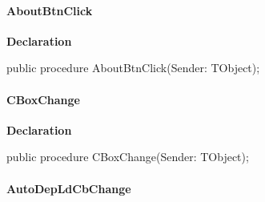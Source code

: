 \documentclass{report}
\newif\ifpdf
\begin{document}
\paragraph*{AboutBtnClick}\hspace*{\fill}

\label{manager.TMnFrm-AboutBtnClick}
\begin{list}{}{
\setlength{\itemindent}{0cm}
\setlength{\listparindent}{0cm}
\setlength{\leftmargin}{\evensidemargin}
\addtolength{\leftmargin}{\tmplength}
\settowidth{\labelsep}{X}
\addtolength{\leftmargin}{\labelsep}
\setlength{\labelwidth}{\tmplength}
}
\item[\textbf{Declaration}\hfill]
\ifpdf
\begin{flushleft}
\fi
\begin{ttfamily}
public procedure AboutBtnClick(Sender: TObject);\end{ttfamily}

\ifpdf
\end{flushleft}
\fi

\end{list}
\paragraph*{CBoxChange}\hspace*{\fill}

\label{manager.TMnFrm-CBoxChange}
\begin{list}{}{
\setlength{\itemindent}{0cm}
\setlength{\listparindent}{0cm}
\setlength{\leftmargin}{\evensidemargin}
\addtolength{\leftmargin}{\tmplength}
\settowidth{\labelsep}{X}
\addtolength{\leftmargin}{\labelsep}
\setlength{\labelwidth}{\tmplength}
}
\item[\textbf{Declaration}\hfill]
\ifpdf
\begin{flushleft}
\fi
\begin{ttfamily}
public procedure CBoxChange(Sender: TObject);\end{ttfamily}

\ifpdf
\end{flushleft}
\fi

\end{list}
\paragraph*{AutoDepLdCbChange}\hspace*{\fill}
\end{document}
